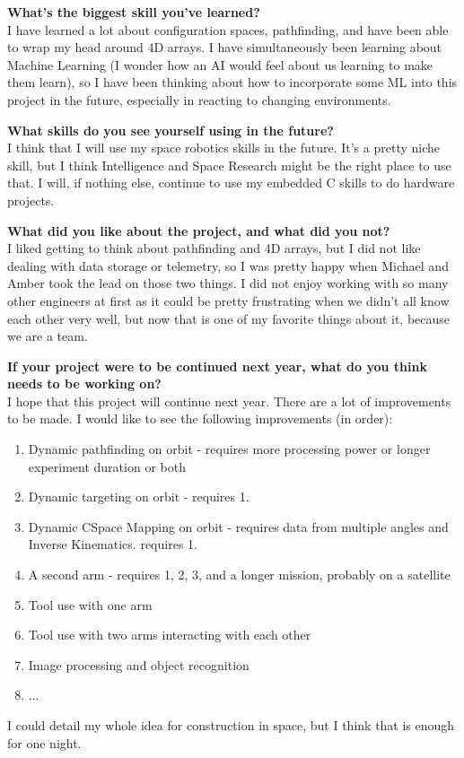\textbf{What's the biggest skill you've learned?} \\ 
I have learned a lot about configuration spaces, pathfinding, and have been able to wrap my head around 4D arrays. I have simultaneously been learning about Machine Learning (I wonder how an AI would feel about us learning to make them learn), so I have been thinking about how to incorporate some ML into this project in the future, especially in reacting to changing environments.

\textbf{What skills do you see yourself using in the future?} \\ 
I think that I will use my space robotics skills in the future. It's a pretty niche skill, but I think Intelligence and Space Research might be the right place to use that. I will, if nothing else, continue to use my embedded C skills to do hardware projects.

\textbf{What did you like about the project, and what did you not?} \\ 
I liked getting to think about pathfinding and 4D arrays, but I did not like dealing with data storage or telemetry, so I was pretty happy when Michael and Amber took the lead on those two things. I did not enjoy working with so many other engineers at first as it could be pretty frustrating when we didn't all know each other very well, but now that is one of my favorite things about it, because we are a team.

\textbf{If your project were to be continued next year, what do you think needs to be working on?} \\ 
I hope that this project will continue next year. There are a lot of improvements to be made. I would like to see the following improvements (in order):

\begin{enumerate}
\item{Dynamic pathfinding on orbit - requires more processing power or longer experiment duration or both}
\item{Dynamic targeting on orbit - requires 1.}
\item{Dynamic CSpace Mapping on orbit - requires data from multiple angles and Inverse Kinematics. requires 1.}
\item{A second arm - requires 1, 2, 3, and a longer mission, probably on a satellite}
\item{Tool use with one arm}
\item{Tool use with two arms interacting with each other}
\item{Image processing and object recognition}
\item{...}
\end{enumerate}
I could detail my whole idea for construction in space, but I think that is enough for one night.

